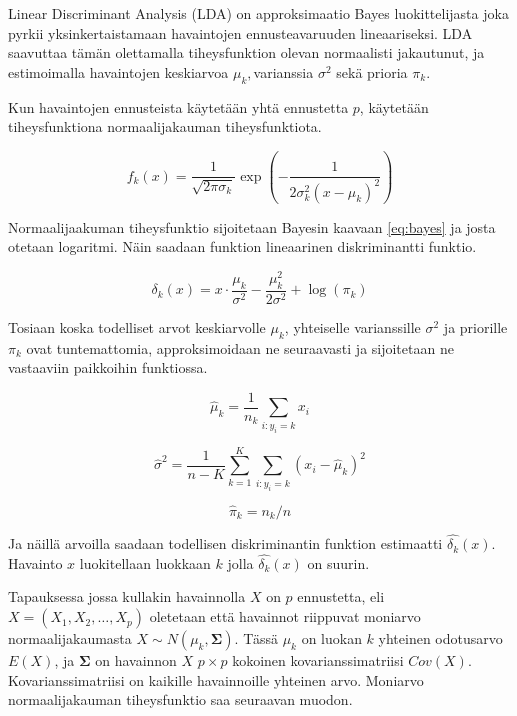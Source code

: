 \documentclass[finnish,twoside,openright]{HYgraduMLDS}
\begin{document}
Linear Discriminant Analysis (LDA) on approksimaatio Bayes luokittelijasta joka pyrkii yksinkertaistamaan havaintojen ennusteavaruuden lineaariseksi. LDA saavuttaa tämän olettamalla tiheysfunktion olevan normaalisti jakautunut, ja estimoimalla havaintojen keskiarvoa $\mu_k, $varianssia $\sigma^2$ sekä prioria $\pi_k$.

Kun havaintojen ennusteista käytetään yhtä ennustetta $p$, käytetään tiheysfunktiona normaalijakauman tiheysfunktiota.

\begin{equation}
    f_k(x) = \frac{1}{\sqrt{2 \pi \sigma_k}} \exp{(-\frac{1}{2 \sigma^2_k (x - \mu_k)^2})}
\end{equation}

Normaalijaakuman tiheysfunktio sijoitetaan Bayesin kaavaan \ref{eq:bayes} ja josta otetaan logaritmi. Näin saadaan funktion lineaarinen diskriminantti funktio.

\begin{equation}
    \delta_k(x) = x \cdot \frac{\mu_k}{\sigma^2} - \frac{\mu^2_k}{2 \sigma^2} + \log(\pi_k)
\end{equation}

Tosiaan koska todelliset arvot keskiarvolle $\mu_k$, yhteiselle varianssille $\sigma^2$ ja priorille $\pi_k$ ovat tuntemattomia, approksimoidaan ne seuraavasti ja sijoitetaan ne vastaaviin paikkoihin funktiossa.

\begin{equation} \label{eq:estimate-mu}
    \hat{\mu}_k = \frac{1}{n_k} \sum_{i:y_i = k} x_i
\end{equation}

\begin{equation}
    \hat{\sigma}^2 = \frac{1}{n - K} \sum^K_{k=1} \sum_{i:y_i = k} (x_i - \hat{\mu}_k)^2
\end{equation}

\begin{equation} \label{eq:estimate-pi}
    \hat{\pi}_k = n_k / n
\end{equation}

Ja näillä arvoilla saadaan todellisen diskriminantin funktion estimaatti $\hat{\delta_k}(x)$. Havainto $x$ luokitellaan luokkaan $k$ jolla $\hat{\delta_k}(x)$ on suurin.

Tapauksessa jossa kullakin havainnolla $X$ on $p$ ennustetta, eli $X = (X_1, X_2, \dots, X_p)$ oletetaan että havainnot riippuvat moniarvo normaalijakaumasta $X \sim N(\mu_k, \pmb{\Sigma})$. Tässä $\mu_k$ on luokan $k$ yhteinen odotusarvo $E(X)$, ja $\pmb{\Sigma}$ on havainnon $X$ $p \times p$ kokoinen kovarianssimatriisi $Cov(X)$. Kovarianssimatriisi on kaikille havainnoille yhteinen arvo. Moniarvo normaalijakauman tiheysfunktio saa seuraavan muodon.
\end{document}
